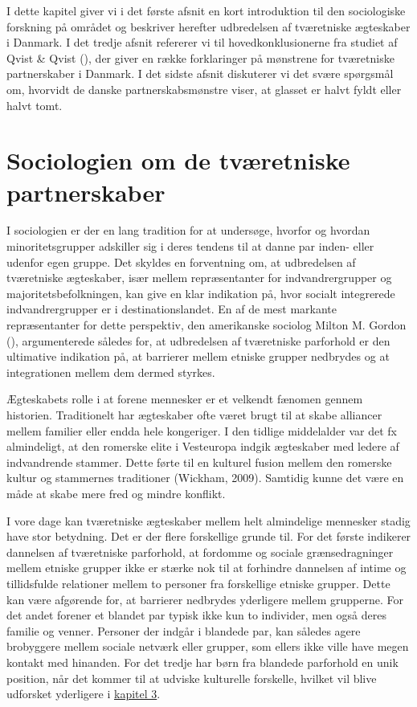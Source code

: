 \documentclass[
]{book}
\begin{document}
I dette kapitel giver vi i det første afsnit en kort introduktion til den sociologiske forskning på området og beskriver herefter udbredelsen af tværetniske ægteskaber i Danmark. I det tredje afsnit refererer vi til hovedkonklusionerne fra studiet af Qvist \& Qvist (), der giver en række forklaringer på mønstrene for tværetniske partnerskaber i Danmark. I det sidste afsnit diskuterer vi det svære spørgsmål om, hvorvidt de danske partnerskabsmønstre viser, at glasset er halvt fyldt eller halvt tomt.

\section{Sociologien om de tværetniske partnerskaber}\label{sociologien-om-de-tvuxe6retniske-partnerskaber}

I sociologien er der en lang tradition for at undersøge, hvorfor og hvordan minoritetsgrupper adskiller sig i deres tendens til at danne par inden- eller udenfor egen gruppe. Det skyldes en forventning om, at udbredelsen af tværetniske ægteskaber, især mellem repræsentanter for indvandrergrupper og majoritetsbefolkningen, kan give en klar indikation på, hvor socialt integrerede indvandrergrupper er i destinationslandet. En af de mest markante repræsentanter for dette perspektiv, den amerikanske sociolog Milton M. Gordon (), argumenterede således for, at udbredelsen af tværetniske parforhold er den ultimative indikation på, at barrierer mellem etniske grupper nedbrydes og at integrationen mellem dem dermed styrkes.

Ægteskabets rolle i at forene mennesker er et velkendt fænomen gennem historien. Traditionelt har ægteskaber ofte været brugt til at skabe alliancer mellem familier eller endda hele kongeriger. I den tidlige middelalder var det fx almindeligt, at den romerske elite i Vesteuropa indgik ægteskaber med ledere af indvandrende stammer. Dette førte til en kulturel fusion mellem den romerske kultur og stammernes traditioner (Wickham, 2009). Samtidig kunne det være en måde at skabe mere fred og mindre konflikt.

I vore dage kan tværetniske ægteskaber mellem helt almindelige mennesker stadig have stor betydning. Det er der flere forskellige grunde til. For det første indikerer dannelsen af tværetniske parforhold, at fordomme og sociale grænsedragninger mellem etniske grupper ikke er stærke nok til at forhindre dannelsen af intime og tillidsfulde relationer mellem to personer fra forskellige etniske grupper. Dette kan være afgørende for, at barrierer nedbrydes yderligere mellem grupperne. For det andet forener et blandet par typisk ikke kun to individer, men også deres familie og venner. Personer der indgår i blandede par, kan således agere brobyggere mellem sociale netværk eller grupper, som ellers ikke ville have megen kontakt med hinanden. For det tredje har børn fra blandede parforhold en unik position, når det kommer til at udviske kulturelle forskelle, hvilket vil blive udforsket yderligere i \hyperref[kap3]{kapitel 3}.
\end{document}
